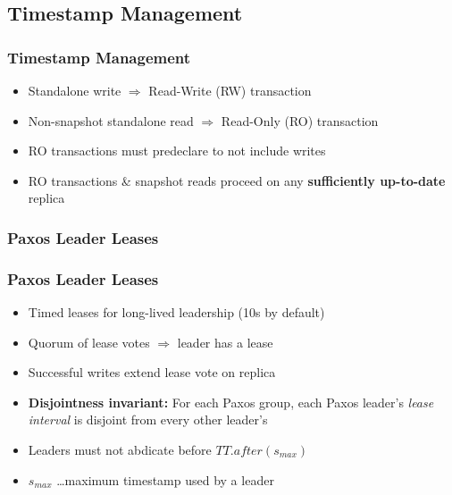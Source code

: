 \documentclass{beamer}
\begin{document}
\subsection{Timestamp Management}
\begin{frame}
  \frametitle{Timestamp Management}
  \begin{itemize}
    \item{Standalone write $\Rightarrow$ Read-Write (RW) transaction}
    \item{Non-snapshot standalone read $\Rightarrow$ Read-Only (RO) transaction}
    \item{RO transactions must predeclare to not include writes}
    \item{RO transactions \& snapshot reads proceed on any
      \textbf{sufficiently up-to-date} replica
    }
  \end{itemize}
\end{frame}

\subsubsection{Paxos Leader Leases}
\begin{frame}
  \frametitle{Paxos Leader Leases}
  \begin{itemize}
    \item{Timed leases for long-lived leadership (10s by default)}
    \item{Quorum of lease votes $\Rightarrow$ leader has a lease}
    \item{Successful writes extend lease vote on replica}
    \item{\textbf{Disjointness invariant:} \newline
      For each Paxos group, each Paxos leader's \emph{lease interval} is disjoint
      from every other leader's
    }
    \item{Leaders must not abdicate before $TT.after(s_{max})$}
    \item{$s_{max}$ \ldots maximum timestamp used by a leader}
  \end{itemize}
\end{frame}
\end{document}
